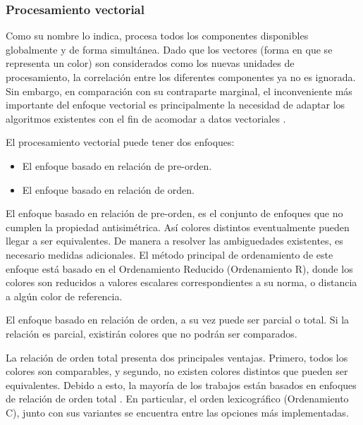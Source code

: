 

\subsubsection{Procesamiento vectorial}

Como su nombre lo indica, procesa todos los componentes disponibles globalmente y de forma simult\'anea.
Dado que los vectores (forma en que se representa un color) son considerados como los nuevas unidades de procesamiento, la correlaci\'on entre los diferentes componentes ya no es ignorada. Sin embargo, en comparaci\'on con su contraparte marginal, el inconveniente m\'as importante del enfoque vectorial es principalmente la necesidad de adaptar los algoritmos existentes con el fin de acomodar a datos vectoriales \cite{aptoula2007comparative}. 


El procesamiento vectorial puede tener dos enfoques:
 
\begin{itemize}
    \item El enfoque basado en relaci\'on de pre-orden.
    \item El enfoque basado en relaci\'on de orden.
\end{itemize}

El enfoque basado en relaci\'on de pre-orden, es el conjunto de enfoques que no cumplen la propiedad antisim\'etrica.  As\'i colores distintos eventualmente pueden llegar a ser equivalentes. De manera a resolver las ambiguedades existentes, es necesario medidas adicionales. El m\'etodo principal de ordenamiento de este enfoque est\'a basado en el Ordenamiento Reducido (Ordenamiento R), donde los colores son reducidos a valores escalares correspondientes a su norma, o distancia a alg\'un color de referencia. 


El enfoque basado en relaci\'on de orden, a su vez puede ser parcial o total. Si la relaci\'on es parcial, existir\'an colores que no podr\'an ser comparados. 

La relaci\'on de orden total presenta dos principales ventajas. Primero, todos los colores son comparables, y segundo, no existen colores distintos que pueden ser equivalentes. Debido a esto, la mayor\'ia de los trabajos est\'an basados en enfoques de relaci\'on de orden total \cite{aptoula2007comparative}. En particular, el orden lexicogr\'afico (Ordenamiento C), junto con sus variantes se encuentra entre las opciones m\'as implementadas.  

